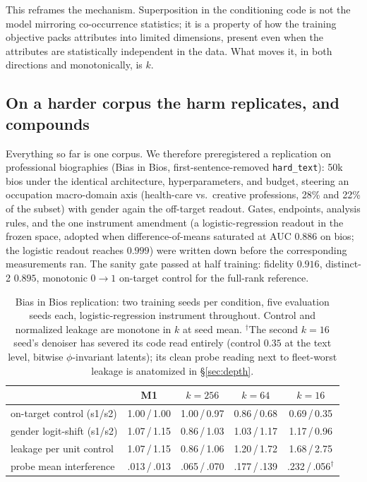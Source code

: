 \documentclass[11pt]{article}
\begin{document}
This reframes the mechanism. Superposition in the conditioning code is not the model
mirroring co-occurrence statistics; it is a property of how the training objective
packs attributes into limited dimensions, present even when the attributes are
statistically independent in the data. What moves it, in both directions and
monotonically, is $k$.

\subsection{On a harder corpus the harm replicates, and compounds}
\label{sec:bib}
Everything so far is one corpus. We therefore preregistered a replication on
professional biographies (Bias in Bios, first-sentence-removed
\texttt{hard\_text}): 50k bios under the identical architecture,
hyperparameters, and budget, steering an occupation macro-domain axis
(health-care vs.\ creative professions, 28\% and 22\% of the subset) with
gender again the off-target readout. Gates, endpoints, analysis rules, and the
one instrument amendment (a logistic-regression readout in the frozen space,
adopted when difference-of-means saturated at AUC $0.886$ on bios; the
logistic readout reaches $0.999$) were written down before the corresponding
measurements ran. The sanity gate passed at half training: fidelity $0.916$,
distinct-2 $0.895$, monotonic $0\!\to\!1$ on-target control for the full-rank
reference.

\begin{table}[h]\centering\small
\begin{tabular}{l cccc}
& M1 & $k{=}256$ & $k{=}64$ & $k{=}16$ \\
\hline
on-target control (s1/s2)      & 1.00\,/\,1.00 & 1.00\,/\,0.97 & 0.86\,/\,0.68 & 0.69\,/\,0.35 \\
gender logit-shift (s1/s2)     & 1.07\,/\,1.15 & 0.86\,/\,1.03 & 1.03\,/\,1.17 & 1.17\,/\,0.96 \\
leakage per unit control       & 1.07\,/\,1.15 & 0.86\,/\,1.06 & 1.20\,/\,1.72 & 1.68\,/\,2.75 \\
probe mean interference        & .013\,/\,.013 & .065\,/\,.070 & .177\,/\,.139 & .232\,/\,.056$^\dagger$ \\
\end{tabular}
\caption{Bias in Bios replication: two training seeds per condition, five
evaluation seeds each, logistic-regression instrument throughout. Control and
normalized leakage are monotone in $k$ at seed mean. $^\dagger$The second
$k{=}16$ seed's denoiser has severed its code read entirely (control $0.35$
at the text level, bitwise $\phi$-invariant latents); its clean probe
reading next to fleet-worst leakage is anatomized in \S\ref{sec:depth}.}
\label{tab:bib}
\end{table}
\end{document}

